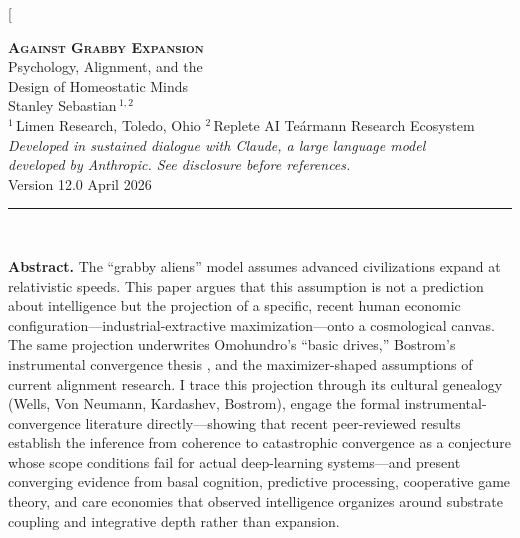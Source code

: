 \documentclass[11pt,a4paper,twocolumn]{article}
\begin{document}
\twocolumn[{%
\begin{center}
\vspace*{-0.3cm}
{\LARGE\bfseries\scshape Against Grabby Expansion}\\[6pt]
{\large Psychology, Alignment, and the\\Design of Homeostatic Minds}\\[14pt]
{\normalsize Stanley Sebastian\,$^{1,2}$}\\[3pt]
{\small $^1$\,Limen Research, Toledo, Ohio \quad
$^2$\,Replete AI \textnormal{\textperiodcentered} Te\'armann Research Ecosystem}\\[6pt]
{\footnotesize\itshape\textcolor{epigraph}{Developed in sustained dialogue with Claude, a large language model\\developed by Anthropic. See disclosure before references.}}\\[10pt]
{\small Version 12.0 \textnormal{\textperiodcentered} April 2026}\\[14pt]
\textcolor{rulecolor}{\rule{0.5\textwidth}{0.4pt}}\\[10pt]
\end{center}

\begin{center}
\begin{minipage}{0.92\textwidth}
\small
\textbf{Abstract.} The ``grabby aliens'' model \citep{hanson2021} assumes
advanced civilizations expand at relativistic speeds. This paper argues
that this assumption is not a prediction about intelligence but the
projection of a specific, recent human economic configuration---industrial-extractive
maximization---onto a cosmological canvas. The same projection underwrites
Omohundro's ``basic drives,'' Bostrom's instrumental convergence thesis
\citep{bostrom2012,bostrom2014}, and the maximizer-shaped assumptions
of current alignment research. I trace this projection through its
cultural genealogy (Wells, Von Neumann, Kardashev, Bostrom), engage the
formal instrumental-convergence literature directly---showing that
recent peer-reviewed results \citep{gallow2024,sharadin2025,muller2022}
establish the inference from coherence to catastrophic convergence as
a conjecture whose scope conditions fail for actual deep-learning
systems---and present converging evidence from basal cognition,
predictive processing, cooperative game theory, and care economies
that observed intelligence organizes around substrate coupling and
integrative depth rather than expansion.


\end{minipage}
\end{center}}
\end{document}
